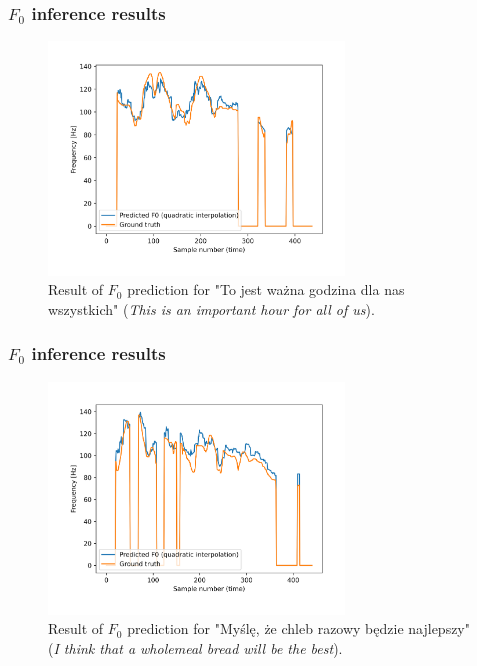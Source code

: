 \documentclass[a4paper,9pt]{beamer}
\theoremstyle{mytheoremstyle}
\begin{document}
\begin{frame}
\frametitle{$F_{0}$ inference results}
\begin{figure}
\begin{center}
  \includegraphics[width=0.7\textwidth]{res/amu_pl_ilo_BAZA_2006C_C0278_simple_pred_freq}
\end{center}
	\caption{Result of $F_0$ prediction for "To jest wa\.zna godzina dla nas wszystkich" (\textit{This is an important hour for all of us}).}
\end{figure}
\end{frame}

\begin{frame}
\frametitle{$F_{0}$ inference results}
\begin{figure}
\begin{center}
  \includegraphics[width=0.7\textwidth]{res/amu_pl_ilo_BAZA_2006C_C0362_simple_pred_freq}
\end{center}
	\caption{Result of $F_0$ prediction for "My\'sl\k{e}, \.ze chleb razowy b\k{e}dzie najlepszy" (\textit{I think that a wholemeal bread will be the best}).}
\end{figure}
\end{frame}
\end{document}
